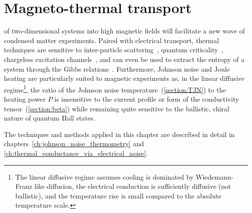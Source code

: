 

\chapter{Magneto-thermal transport}
\label{ch:magneto-thermal_transport}
 of two-dimensional systems into high magnetic fields will facilitate a new wave of condensed matter experiments. Paired with electrical transport, thermal techniques are sensitive to inter-particle scattering~\cite{muller_collective_2008, crossno_observation_2016, lucas_transport_2016}, quantum criticality~\cite{sachdev_quantum_2011, muller_quantum-critical_2008}, chargeless excitation channels~\cite{kane_thermal_1996, wakeham_gross_2011,??}, and can even be used to extract the entropy of a system through the Gibbs relations~\cite{??}. Furthermore, Johnson noise and Joule heating are particularly suited to magnetic experiments as, in the linear diffusive regime\footnote{The linear diffusive regime assumes cooling is dominated by Wiedemann-Franz like diffusion, the electrical conduction is sufficiently diffusive (not ballistic), and the temperature rise is small compared to the absolute temperature scale.}, the ratio of the Johnson noise temperature~(\ref{section:TJN}) to the heating power $P$ is insensitive to the current profile or form of the conductivity tensor~(\ref{section:beta}) while remaining quite sensitive to the ballistic, chiral nature of quantum Hall states.

The techniques and methods applied in this chapter are described in detail in chapters~\ref{ch:johnson_noise_thermometry} and \ref{ch:thermal_conductance_via_electrical_noise}.

